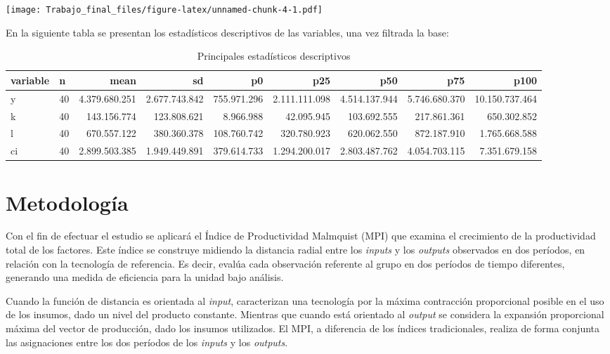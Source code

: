 \documentclass[
]{article}
\begin{document}
\texttt{[image: Trabajo\_final\_files/figure-latex/unnamed-chunk-4-1.pdf]}

En la siguiente tabla se presentan los estadísticos descriptivos de las
variables, una vez filtrada la base:

\begin{table}[H]

\caption{\label{tab:unnamed-chunk-5}Principales estadísticos descriptivos}
\centering
\begin{tabular}[t]{llrrrrrrr}
\toprule
variable & n & mean & sd & p0 & p25 & p50 & p75 & p100\\
\midrule
\rowcolor{gray!6}  y & 40 & 4.379.680.251 & 2.677.743.842 & 755.971.296 & 2.111.111.098 & 4.514.137.944 & 5.746.680.370 & 10.150.737.464\\
k & 40 & 143.156.774 & 123.808.621 & 8.966.988 & 42.095.945 & 103.692.555 & 217.861.361 & 650.302.852\\
\rowcolor{gray!6}  l & 40 & 670.557.122 & 380.360.378 & 108.760.742 & 320.780.923 & 620.062.550 & 872.187.910 & 1.765.668.588\\
ci & 40 & 2.899.503.385 & 1.949.449.891 & 379.614.733 & 1.294.200.017 & 2.803.487.762 & 4.054.703.115 & 7.351.679.158\\
\bottomrule
\end{tabular}
\end{table}

\hypertarget{metodologuxeda}{%
\section{Metodología}\label{metodologuxeda}}

Con el fin de efectuar el estudio se aplicará el Índice de Productividad
Malmquist (MPI) que examina el crecimiento de la productividad total de
los factores. Este índice se construye midiendo la distancia radial
entre los \emph{inputs} y los \emph{outputs} observados en dos períodos,
en relación con la tecnología de referencia. Es decir, evalúa cada
observación referente al grupo en dos períodos de tiempo diferentes,
generando una medida de eficiencia para la unidad bajo análisis.

Cuando la función de distancia es orientada al \emph{input},
caracterizan una tecnología por la máxima contracción proporcional
posible en el uso de los insumos, dado un nivel del producto constante.
Mientras que cuando está orientado al \emph{output} se considera la
expansión proporcional máxima del vector de producción, dado los insumos
utilizados. El MPI, a diferencia de los índices tradicionales, realiza
de forma conjunta las asignaciones entre los dos períodos de los
\emph{inputs} y los \emph{outputs}.
\end{document}
